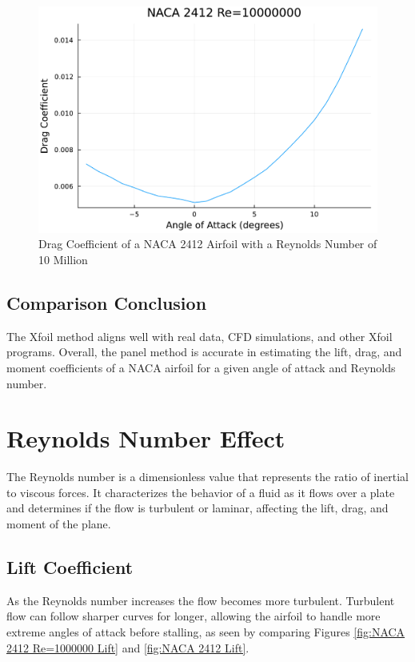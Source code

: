\documentclass{article}
\begin{document}
\begin{figure}[h]
\begin{minipage}[b]{0.32\textwidth}
\includegraphics[width=\textwidth]{NACA 2412 Re=10000000_Drag_Coefficent_Plot.pdf}
\caption{\label{fig:NACA 2412 Drag Re=10000000}Drag Coefficient of a NACA 2412 Airfoil with a Reynolds Number of 10 Million}
\end{minipage}
\end{figure}

\subsection{Comparison Conclusion}
The Xfoil method aligns well with real data, CFD simulations, and other Xfoil programs. Overall, the panel method is accurate in estimating the lift, drag, and moment coefficients of a NACA airfoil for a given angle of attack and Reynolds number.

\section{Reynolds Number Effect}

The Reynolds number is a dimensionless value that represents the ratio of inertial to viscous forces. It characterizes the behavior of a fluid as it flows over a plate and determines if the flow is turbulent or laminar, affecting the lift, drag, and moment of the plane.

\subsection{Lift Coefficient}

As the Reynolds number increases the flow becomes more turbulent. Turbulent flow can follow sharper curves for longer, allowing the airfoil to handle more extreme angles of attack before stalling, as seen by comparing Figures \ref{fig:NACA 2412 Re=1000000 Lift} and \ref{fig:NACA 2412 Lift}.
\end{document}
